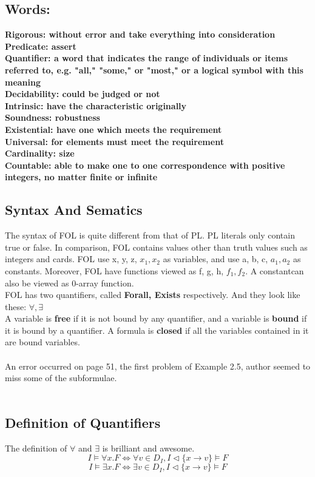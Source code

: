 \documentclass{article}
\begin{document}
\subsection{Words:}
\textbf{Rigorous: without error and take everything into consideration}\\
\textbf{Predicate: assert}\\
\textbf{Quantifier: a word that indicates the range of individuals or items referred to, e.g. "all," "some," or "most," or a logical symbol with this meaning}\\
\textbf{Decidability: could be judged or not}\\
\textbf{Intrinsic: have the characteristic originally}\\
\textbf{Soundness: robustness}\\
\textbf{Existential: have one which meets the requirement}\\
\textbf{Universal: for elements must meet the requirement}\\
\textbf{Cardinality: size}\\
\textbf{Countable: able to make one to one correspondence with positive integers, no matter finite or infinite}\\


\subsection{Syntax And Sematics}
The syntax of FOL is quite different from that of PL. PL literals only contain true or false. In comparison, FOL contains values other than truth values such as integers and cards. FOL use x, y, z, $x_1, x_2$ as variables, and use a, b, c, $a_1, a_2$ as constants. Moreover, FOL have functions viewed as f, g, h, $f_1, f_2$. A  constantcan also be viewed as 0-array function.\\
FOL has two quantifiers, called \textbf{Forall, Exists} respectively. And they look like these: $\forall, \exists$\\
A variable is \textbf{free} if it is not bound by any quantifier, and a variable is \textbf{bound} if it is bound by a quantifier. A formula is \textbf{closed} if all the variables contained in it are bound variables.\\\\
An error occurred on page 51, the first problem of Example 2.5, author seemed to miss some of the subformulae.\\\\

\subsection{Definition of Quantifiers}
The definition of $\forall$ and $\exists$ is brilliant and awesome.
$$I \models \forall x.F \iff \forall v \in D_I, I \triangleleft \lbrace x \rightarrow v \rbrace \models F$$
$$I \models \exists x.F \iff \exists v \in D_I, I \triangleleft \lbrace x \rightarrow v \rbrace \models F$$
\end{document}
